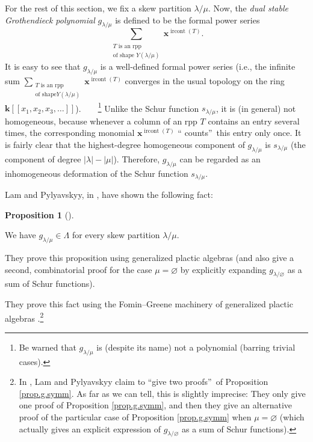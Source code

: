 \documentclass[numbers=enddot,12pt,final,onecolumn,notitlepage]{scrartcl}%
\theoremstyle{definition}
\newtheorem{prop}[theo]{Proposition}
\newenvironment{proposition}[1][]
{\begin{prop}[#1]\begin{leftbar}}
{\end{leftbar}\end{prop}}
\newenvironment{verlong}{}{}
\newenvironment{vershort}{}{}
\let\sumnonlimits\sum
\renewcommand{\sum}{\sumnonlimits\limits}
\begin{document}
For the rest of this section, we fix a skew partition $\lambda/\mu$. Now, the
\textit{dual stable Grothendieck polynomial} $g_{\lambda/\mu}$ is defined to
be the formal power series%
\[
\sum_{\substack{T\text{ is an rpp}\\\text{of shape }Y\left(  \lambda
/\mu\right)  }}\mathbf{x}^{\operatorname*{ircont}\left(  T\right)  }.
\]
It is easy to see that $g_{\lambda/\mu}$ is a well-defined formal power series
(i.e., the infinite sum $\sum_{\substack{T\text{ is an rpp}\\\text{of shape
}Y\left(  \lambda/\mu\right)  }}\mathbf{x}^{\operatorname*{ircont}\left(
T\right)  }$ converges in the usual topology on the ring $\mathbf{k}\left[
\left[  x_{1},x_{2},x_{3},\ldots\right]  \right]  $).\ \ \ \ \footnote{Be
warned that $g_{\lambda/\mu}$ is (despite its name) not a polynomial (barring
trivial cases).} Unlike the Schur function $s_{\lambda/\mu}$, it is (in
general) not homogeneous, because whenever a column of an rpp $T$ contains an
entry several times, the corresponding monomial $\mathbf{x}%
^{\operatorname*{ircont}\left(  T\right)  }$ \textquotedblleft
counts\textquotedblright\ this entry only once. It is fairly clear that the
highest-degree homogeneous component of $g_{\lambda/\mu}$ is $s_{\lambda/\mu}$
(the component of degree $\left\vert \lambda\right\vert -\left\vert
\mu\right\vert $). Therefore, $g_{\lambda/\mu}$ can be regarded as an
inhomogeneous deformation of the Schur function $s_{\lambda/\mu}$.

Lam and Pylyavskyy, in \cite[\S 9.1]{LamPyl}, have shown the following fact:

\begin{proposition}
\label{prop.g.symm}We have $g_{\lambda/\mu}\in\Lambda$ for every skew
partition $\lambda/\mu$.
\end{proposition}

\begin{vershort}
They prove this proposition using generalized plactic algebras \cite[Lemma
3.1]{FomGre} (and also give a second, combinatorial proof for the case
$\mu=\varnothing$ by explicitly expanding $g_{\lambda/\varnothing}$ as a sum
of Schur functions).
\end{vershort}

\begin{verlong}
They prove this fact using the Fomin--Greene machinery of generalized plactic
algebras \cite{FomGre}.\footnote{In \cite[\S 9.1]{LamPyl}, Lam and Pylyavskyy
claim to \textquotedblleft give two proofs\textquotedblright\ of Proposition
\ref{prop.g.symm}. As far as we can tell, this is slightly imprecise: They
only give one proof of Proposition \ref{prop.g.symm}, and then they give an
alternative proof of the particular case of Proposition \ref{prop.g.symm} when
$\mu=\varnothing$ (which actually gives an explicit expression of
$g_{\lambda/\varnothing}$ as a sum of Schur functions).}
\end{verlong}
\end{document}
